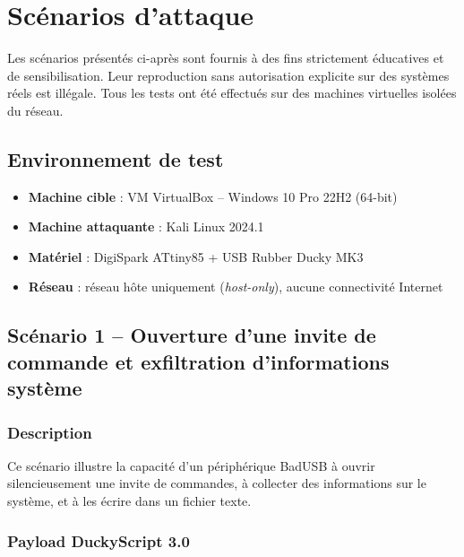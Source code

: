 \documentclass[12pt,a4paper]{report}
\begin{document}
\chapter{Scénarios d'attaque}
\label{chap:scenarios}

\begin{alertbox}
Les scénarios présentés ci-après sont fournis à des fins strictement éducatives et de sensibilisation. Leur reproduction sans autorisation explicite sur des systèmes réels est illégale. Tous les tests ont été effectués sur des machines virtuelles isolées du réseau.
\end{alertbox}

\section{Environnement de test}

\begin{itemize}
  \item \textbf{Machine cible} : VM VirtualBox -- Windows 10 Pro 22H2 (64-bit)
  \item \textbf{Machine attaquante} : Kali Linux 2024.1
  \item \textbf{Matériel} : DigiSpark ATtiny85 + USB Rubber Ducky MK3
  \item \textbf{Réseau} : réseau hôte uniquement (\textit{host-only}), aucune connectivité Internet
\end{itemize}

\section{Scénario 1 -- Ouverture d'une invite de commande et exfiltration d'informations système}

\subsection{Description}

Ce scénario illustre la capacité d'un périphérique BadUSB à ouvrir silencieusement une invite de commandes, à collecter des informations sur le système, et à les écrire dans un fichier texte.

\subsection{Payload DuckyScript 3.0}
\end{document}
